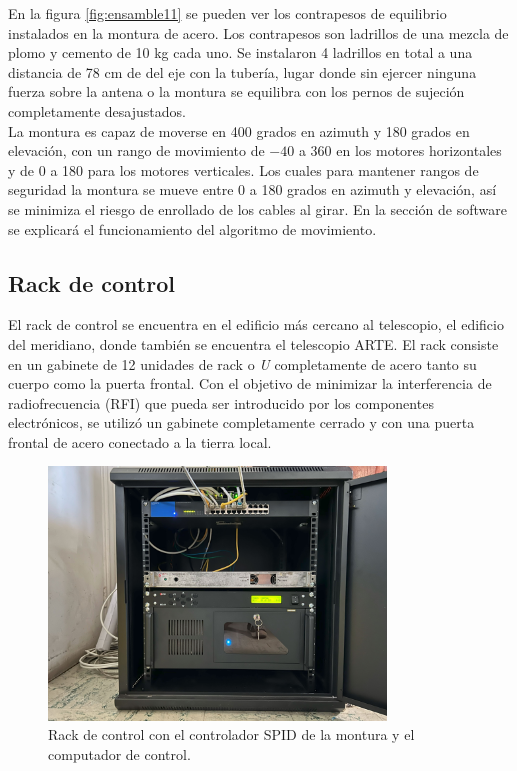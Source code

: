 En la figura \ref{fig:ensamble11} se pueden ver los contrapesos de equilibrio instalados en la montura de acero. Los contrapesos son ladrillos de una mezcla de plomo y cemento de 10 kg cada uno. Se instalaron 4 ladrillos en total a una distancia de 78 cm de del eje con la tubería, lugar donde sin ejercer ninguna fuerza sobre la antena o la montura se equilibra con los pernos de sujeción completamente desajustados.\\

La montura es capaz de moverse en 400 grados en azimuth y 180 grados en elevación, con un rango de movimiento de $-40$ a 360 en los motores horizontales y de 0 a 180 para los motores verticales. Los cuales para mantener rangos de seguridad la montura se mueve entre 0 a 180 grados en azimuth y elevación, así se minimiza el riesgo de enrollado de los cables al girar. En la sección de software se explicará el funcionamiento del algoritmo de movimiento.\\

\subsection{Rack de control}

El rack de control se encuentra en el edificio más cercano al telescopio, el edificio del meridiano, donde también se encuentra el telescopio ARTE. El rack consiste en un gabinete de 12 unidades de rack o \textit{U} completamente de acero tanto su cuerpo como la puerta frontal. Con el objetivo de minimizar la interferencia de radiofrecuencia (RFI) que pueda ser introducido por los componentes electrónicos, se utilizó un gabinete completamente cerrado y con una puerta frontal de acero conectado a la tierra local.\\


\begin{figure}
    \centering
    \includegraphics[width=0.8\textwidth]{img/rack}
    \caption{Rack de control con el controlador SPID de la montura y el computador de control.}
    \label{fig:ensamble12}
\end{figure}

